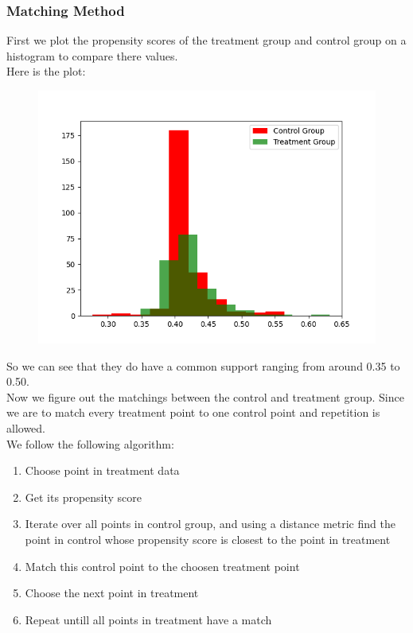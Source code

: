 \documentclass{article}
\begin{document}
\subsubsection{Matching Method}
First we plot the propensity scores of the treatment group and
control group on a histogram to compare there values.\\
Here is the plot:\\
\begin{figure}[h]
    \centering
    \includegraphics[width = 15 cm]{../treatmentvscontrol_common_base.png}
\end{figure}

So we can see that they do have a common support ranging from 
around 0.35 to 0.50.\\
\clearpage
Now we figure out the matchings between the control and treatment group.
Since we are to match every treatment point to one control point 
and repetition is allowed.\\
We follow the following algorithm:\\
\begin{enumerate}
    \item Choose point in treatment data
    \item Get its propensity score
    \item Iterate over all points in control group, and using a distance metric find the point in control whose propensity score is closest to the point in treatment
    \item Match this control point to the choosen treatment point
    \item Choose the next point in treatment
    \item Repeat untill all points in treatment have a match
\end{enumerate}
\end{document}
